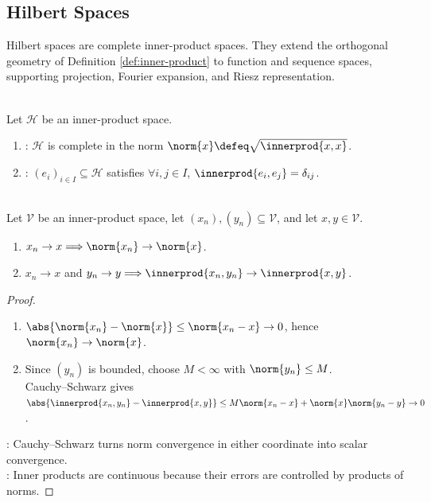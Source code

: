 \subsection{Hilbert Spaces}

%

Hilbert spaces are complete inner-product spaces. They extend the orthogonal geometry of Definition \ref{def:inner-product} to function and sequence spaces, supporting projection, Fourier expansion, and Riesz representation.

\begin{definition} \label{def:hilbert-space} \\
Let $\mathcal{H}$ be an inner-product space.
\begin{enumerate}[label=(\roman*)]
\setlength{\itemsep}{0pt}
\item {}: $\mathcal{H}$ is complete in the norm $\norm{x}\defeq\sqrt{\innerprod{x,x}}$.
\item {}: $(e_i)_{i\in I}\subseteq\mathcal{H}$ satisfies $\forall i,j\in I$, $\innerprod{e_i,e_j}=\delta_{ij}$.
\end{enumerate}
\end{definition}

\begin{proposition} \label{prop:inner-product-and-norm-continuity} \\
Let $\mathcal{V}$ be an inner-product space, let $(x_n),(y_n)\subseteq\mathcal{V}$, and let $x,y\in\mathcal{V}$.
\begin{enumerate}[label=(\roman*)]
\setlength{\itemsep}{0pt}
\item $x_n\to x\Longrightarrow\norm{x_n}\to\norm{x}$.
\item $x_n\to x$ and $y_n\to y\Longrightarrow\innerprod{x_n,y_n}\to\innerprod{x,y}$.
\end{enumerate}
\begin{proof}
\begin{enumerate}[label=(\roman*)]
\setlength{\itemsep}{0pt}
\item $\abs{\norm{x_n}-\norm{x}}\leq\norm{x_n-x}\to0$, hence $\norm{x_n}\to\norm{x}$.
\item Since $(y_n)$ is bounded, choose $M<\infty$ with $\norm{y_n}\leq M$.\\
Cauchy--Schwarz gives $\abs{\innerprod{x_n,y_n}-\innerprod{x,y}}\leq M\norm{x_n-x}+\norm{x}\norm{y_n-y}\to0$.
\end{enumerate}
: Cauchy--Schwarz turns norm convergence in either coordinate into scalar convergence.\\
: Inner products are continuous because their errors are controlled by products of norms.
\end{proof}
\end{proposition}

